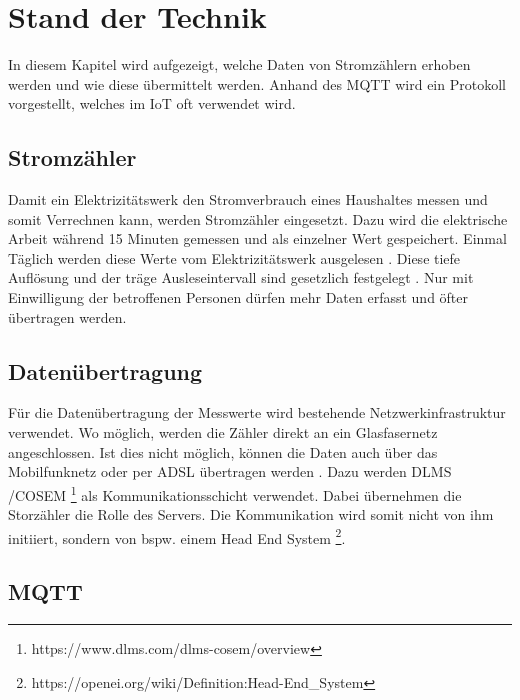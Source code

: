 \chapter{Stand der Technik}

In diesem Kapitel wird aufgezeigt,
welche Daten von Stromzählern erhoben werden und wie diese übermittelt werden.
Anhand des \ac{MQTT} wird ein Protokoll vorgestellt, welches im \ac{IoT} oft verwendet wird.
\section{Stromzähler}
Damit ein Elektrizitätswerk den Stromverbrauch eines Haushaltes messen und somit Verrechnen kann, werden Stromzähler eingesetzt.
Dazu wird die elektrische Arbeit während 15 Minuten gemessen und als einzelner Wert gespeichert.
Einmal Täglich werden diese Werte vom Elektrizitätswerk ausgelesen \parencite{smart_meter_faq}.
Diese tiefe Auflösung und der träge Ausleseintervall sind gesetzlich festgelegt \parencite{admin_strom_VV_art8d}.
Nur mit Einwilligung der betroffenen Personen dürfen mehr Daten erfasst und öfter übertragen werden.

\section{Datenübertragung}
Für die Datenübertragung der Messwerte wird bestehende Netzwerkinfrastruktur verwendet.
Wo möglich, werden die Zähler direkt an ein Glasfasernetz angeschlossen.
Ist dies nicht möglich, können die Daten auch über das Mobilfunknetz oder per ADSL übertragen werden \parencite{smart_meter_faq}.  %
Dazu werden DLMS /COSEM \footnote{https://www.dlms.com/dlms-cosem/overview} als Kommunikationsschicht verwendet.
Dabei übernehmen die Storzähler die Rolle des Servers.
Die Kommunikation wird somit nicht von ihm initiiert,
sondern von bspw. einem Head End System \footnote{https://openei.org/wiki/Definition:Head-End\_System}.


\section{MQTT} %
\label{state:mqtt}

